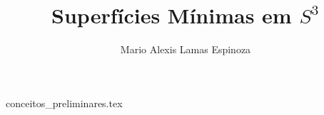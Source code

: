\documentclass[12pt]{book}
\title{Superfícies Mínimas em $S^3$}
\author{Mario Alexis Lamas Espinoza}
\date{ }
\theoremstyle{definition}
\theoremstyle{definition}
\theoremstyle{definition}
\theoremstyle{definition}
\theoremstyle{definition}
\theoremstyle{definition}
\theoremstyle{definition}
\begin{document}
\maketitle

\tableofcontents

{conceitos_preliminares.tex}
\end{document}
